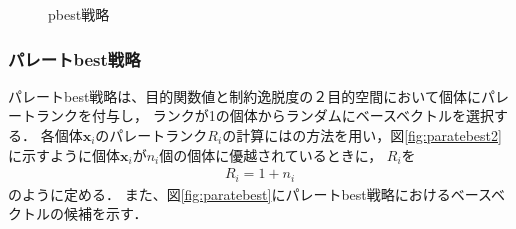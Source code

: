 \documentclass[a4paper,12pt]{jsreport}
\begin{document}
\begin{figure}[htbp]
  \begin{center}
  \hfill
  \end{center}

  \caption{pbest戦略}
  \label{fig:pbest図}
\end{figure}



\subsubsection{パレートbest戦略}
パレートbest戦略は、目的関数値と制約逸脱度の２目的空間において個体にパレートランクを付与し，
ランクが1の個体からランダムにベースベクトルを選択する\cite{先行研究}．
各個体$\bm{x}_i$のパレートランク$R_i$の計算には\cite{fonseca1993genetic}の方法を用い，図\ref{fig:paratebest2}に示すように個体$\bm{x}_i$が$n_i$個の個体に優越されているときに，
$R_i$を
\begin{eqnarray}
R_i=1+n_i
\label{eq:RANK}
\end{eqnarray}
のように定める．
また、図\ref{fig:paratebest}にパレートbest戦略におけるベースベクトルの候補を示す．
\end{document}
